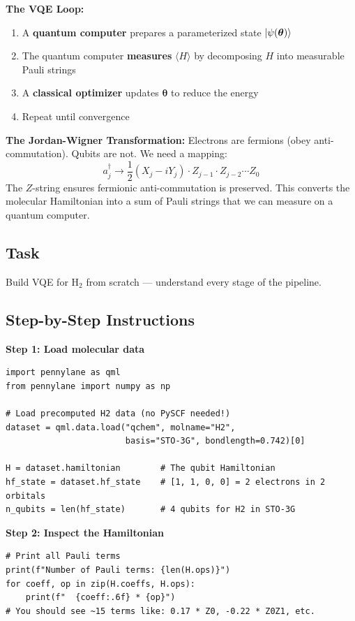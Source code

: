 \documentclass[11pt,a4paper]{article}
\begin{document}
\textbf{The VQE Loop:}
\begin{enumerate}
    \item A \textbf{quantum computer} prepares a parameterized state $\ket{\psi(\boldsymbol{\theta})}$
    \item The quantum computer \textbf{measures} $\langle H \rangle$ by decomposing $H$ into measurable Pauli strings
    \item A \textbf{classical optimizer} updates $\boldsymbol{\theta}$ to reduce the energy
    \item Repeat until convergence
\end{enumerate}

\textbf{The Jordan-Wigner Transformation:} Electrons are fermions (obey anti-commutation). Qubits are not. We need a mapping:
\[
a_j^\dagger \to \frac{1}{2}(X_j - iY_j) \cdot Z_{j-1} \cdot Z_{j-2} \cdots Z_0
\]
The $Z$-string ensures fermionic anti-commutation is preserved. This converts the molecular Hamiltonian into a sum of Pauli strings that we can measure on a quantum computer.

\subsection*{Task}
Build VQE for H$_2$ from scratch --- understand every stage of the pipeline.

\subsection*{Step-by-Step Instructions}

\textbf{Step 1: Load molecular data}
\begin{lstlisting}
import pennylane as qml
from pennylane import numpy as np

# Load precomputed H2 data (no PySCF needed!)
dataset = qml.data.load("qchem", molname="H2",
                        basis="STO-3G", bondlength=0.742)[0]

H = dataset.hamiltonian        # The qubit Hamiltonian
hf_state = dataset.hf_state    # [1, 1, 0, 0] = 2 electrons in 2 orbitals
n_qubits = len(hf_state)       # 4 qubits for H2 in STO-3G
\end{lstlisting}

\textbf{Step 2: Inspect the Hamiltonian}
\begin{lstlisting}
# Print all Pauli terms
print(f"Number of Pauli terms: {len(H.ops)}")
for coeff, op in zip(H.coeffs, H.ops):
    print(f"  {coeff:.6f} * {op}")
# You should see ~15 terms like: 0.17 * Z0, -0.22 * Z0Z1, etc.
\end{lstlisting}
\end{document}
